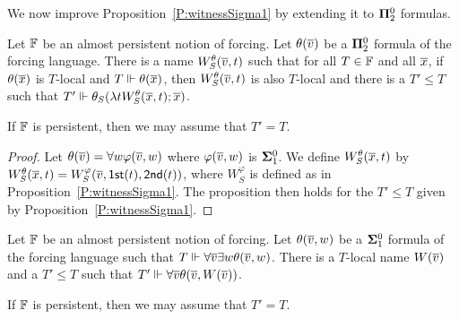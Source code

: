 We now improve Proposition~\ref{P:witnessSigma1}
by extending it to $\mathbf{\Pi}^0_2$ formulas.

\begin{prop}\label{P:witnessPi2}
Let $\mathbb{F}$ be an almost persistent notion of forcing.
Let $\theta(\overline{v})$ be a $\mathbf{\Pi}^0_2$ formula of the forcing language.
There is a name $W^\theta_S(\overline{v},t)$
such that for all $T\in\mathbb{F}$ and all $\overline{x}$, if $\theta(\overline{x})$ is $T$-local
and $T\Vdash\theta(\overline{x})$, then $W^\theta_S(\overline{v},t)$ is also $T$-local
and there is a $T'\leq T$ such that
$T'\Vdash\theta_S(\lambda tW_S^\theta(\overline{x},t);\overline{x})$.

If $\mathbb{F}$ is persistent, then we may assume that $T'=T$.
\end{prop}
\begin{proof}
Let $\theta(\overline{v})=\forall w\varphi(\overline{v},w)$ where $\varphi(\overline{v},w)$ is $\mathbf{\Sigma}^0_1$.
We define $W^\theta_S(\overline{x},t)$ by
$W^\theta_S(\overline{x},t)=W^\varphi_S(\overline{v},\mathsf{1st}(t),\mathsf{2nd}(t))$,
where $W^\varphi_S$ is defined as in Proposition~\ref{P:witnessSigma1}.
The proposition then holds for the $T'\leq T$ given by Proposition~\ref{P:witnessSigma1}.
\end{proof}

\begin{cor}\label{C:Pi1unif}
Let $\mathbb{F}$ be an almost persistent notion of forcing.
Let $\theta(\overline{v},w)$ be a $\mathbf{\Sigma}^0_1$ formula of the forcing language
such that $T\Vdash\forall\overline{v}\exists w\theta(\overline{v},w)$.
There is a $T$-local name $W(\overline{v})$
and a $T'\leq T$ such that
$T'\Vdash\forall\overline{v}\theta(\overline{v},W(\overline{v}))$.

If $\mathbb{F}$ is persistent, then we may assume that $T'=T$.
\end{cor}
